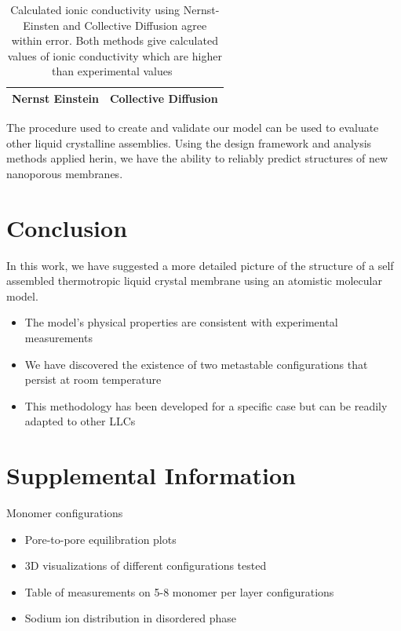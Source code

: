 \documentclass{article}
\begin{document}
\begin{itemize}
	\begin{table}
	\centering
	\begin{tabular}{|c|c|}
	\hline
	Nernst Einstein & Collective Diffusion \\
	\hline
	\end{tabular}
	\caption{Calculated ionic conductivity using Nernst-Einsten and Collective Diffusion agree within error. Both methods give calculated values of ionic conductivity which are higher than experimental values~\label{table:conductivity}}
	\end{table}

	The procedure used to create and validate our model can be used to evaluate other liquid crystalline assemblies. Using the design framework and analysis methods applied herin, we have the ability to reliably predict structures of new nanoporous membranes.

	\section{Conclusion}
	
	In this work, we have suggested a more detailed picture of the structure of a self assembled thermotropic liquid crystal membrane using an atomistic molecular model.
	\begin{itemize}
		\item The model's physical properties are consistent with experimental measurements
		\item We have discovered the existence of two metastable configurations that persist at room temperature
		\item This methodology has been developed for a specific case but can be readily adapted to other LLCs
	\end{itemize}

	\section{Supplemental Information}
	
	Monomer configurations
	\begin{itemize}
		\item Pore-to-pore equilibration plots
		\item 3D visualizations of different configurations tested
		\item Table of measurements on 5-8 monomer per layer configurations
		\item Sodium ion distribution in disordered phase
	\end{itemize}
	

\end{itemize}
\end{document}

